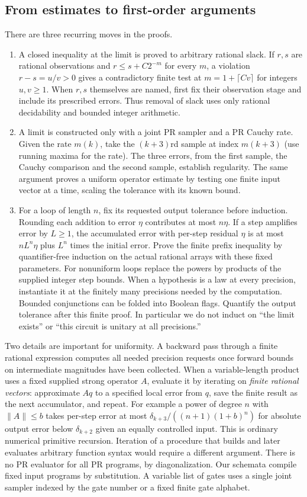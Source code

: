 \subsection{From estimates to first-order arguments}
There are three recurring moves in the proofs.
\begin{enumerate}
\item A closed inequality at the limit is proved to arbitrary rational slack. If $r,s$ are rational observations and $r\le s+C2^{-m}$ for every $m$, a violation $r-s=u/v>0$ gives a contradictory finite test at $m=1+\lceil Cv\rceil$ for integers $u,v\ge1$. When $r,s$ themselves are named, first fix their observation stage and include its prescribed errors. Thus removal of slack uses only rational decidability and bounded integer arithmetic.
\item A limit is constructed only with a joint PR sampler and a PR Cauchy rate. Given the rate $m(k)$, take the $(k+3)$rd sample at index $m(k+3)$ (use running maxima for the rate). The three errors, from the first sample, the Cauchy comparison and the second sample, establish regularity. The same argument proves a uniform operator estimate by testing one finite input vector at a time, scaling the tolerance with its known bound.
\item For a loop of length $n$, fix its requested output tolerance before induction. Rounding each addition to error $\eta$ contributes at most $n\eta$. If a step amplifies error by $L\ge1$, the accumulated error with per-step residual $\eta$ is at most $nL^n\eta$ plus $L^n$ times the initial error. Prove the finite prefix inequality by quantifier-free induction on the actual rational arrays with these fixed parameters. For nonuniform loops replace the powers by products of the supplied integer step bounds. When a hypothesis is a law at every precision, instantiate it at the finitely many precisions needed by the computation. Bounded conjunctions can be folded into Boolean flags. Quantify the output tolerance after this finite proof. In particular we do not induct on ``the limit exists'' or ``this circuit is unitary at all precisions.''
\end{enumerate}
Two details are important for uniformity. A backward pass through a finite rational expression computes all needed precision requests once forward bounds on intermediate magnitudes have been collected. When a variable-length product uses a fixed supplied strong operator $A$, evaluate it by iterating on \emph{finite rational vectors}: approximate $Aq$ to a specified local error from $q$, save the finite result as the next accumulator, and repeat. For example a power of degree $n$ with $\|A\|\le b$ takes per-step error at most $\delta_{k+3}/((n+1)(1+b)^n)$ for absolute output error below $\delta_{k+2}$ given an equally controlled input. This is ordinary numerical primitive recursion. Iteration of a procedure that builds and later evaluates arbitrary function syntax would require a different argument. There is no PR evaluator for all PR programs, by diagonalization. Our schemata compile fixed input programs by substitution. A variable list of gates uses a single joint sampler indexed by the gate number or a fixed finite gate alphabet.

